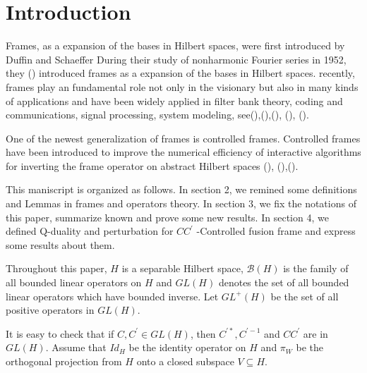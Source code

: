 \documentclass{mfatshort}
\begin{document}
\section{Introduction}
Frames, as a expansion of the bases in Hilbert spaces, were first introduced
by Duffin and Schaeffer During their study of nonharmonic Fourier series in 1952, they (\cite{Duffin}) introduced frames as a expansion of the bases in Hilbert spaces. 
recently, frames play an fundamental role not only in the visionary  but also in many kinds of applications and have been widely applied in filter bank theory, coding and communications, signal processing, system modeling, see(\cite{Musazadeh}),(\cite{Strohmer}),({\cite{Feichtinger}}), ({\cite{cassaza}}), ({\cite{Blo}}).


One of the newest generalization of frames is controlled frames. Controlled frames have been introduced  to improve the numerical efficiency of interactive algorithms for inverting the frame operator on abstract Hilbert spaces (\cite{Balazs}), (\cite{Khosravi}),(\cite{Hua}).


This maniscript is organized as follows. In section 2, we remined some definitions and Lemmas in frames and operators theory. In section 3, we fix the notations of this paper, summarize known and prove some new results. In section 4, we defined Q-duality and perturbation for $CC^{\prime}$ -Controlled fusion frame and express some results about them.

Throughout this paper,  $H$ is a separable Hilbert space, $\mathcal{B}(H)$ is the family of all bounded linear operators on $H$ and $GL(H)$ denotes the set of all bounded linear operators which have bounded inverse. Let $GL^{+}(H)$ be the set of all positive operators in $GL(H)$.

It is easy to check that if $C, C^{\prime} \in GL(H)$, then  $C^{\prime*}, C^{\prime-1}$ and $CC^{\prime}$ are  in $GL(H)$.
Assume that $Id_{H}$ be the identity operator on $H$  and $\pi_W$ be the orthogonal projection from $H$ onto a closed subspace $V\subseteq H$.
\end{document}
